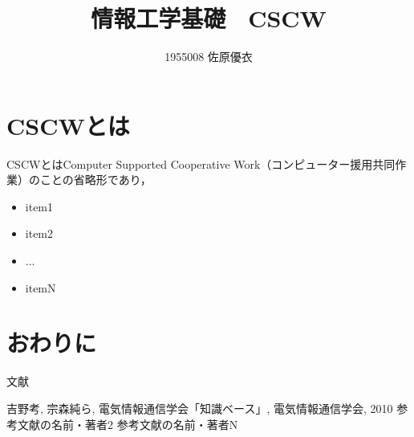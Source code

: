 \documentclass[a4paper]{jsarticle}
\title{情報工学基礎　CSCW}
\author{1955008   	佐原優衣}
\date{}
\begin{document}
\maketitle

\section*{CSCWとは}
CSCWとはComputer Supported Cooperative Work（コンピューター援用共同作業）のことの省略形であり，
\begin{itemize}
  \item item1
  \item item2
  \item ...
  \item itemN
\end{itemize}



\section{おわりに}
文献\cite{key1}

\begin{thebibliography}{3}
   {吉野考, 宗森純ら, 電気情報通信学会「知識ベース」, 電気情報通信学会, 2010}
   参考文献の名前・著者2
   参考文献の名前・著者N
\end{thebibliography}
\end{document}
